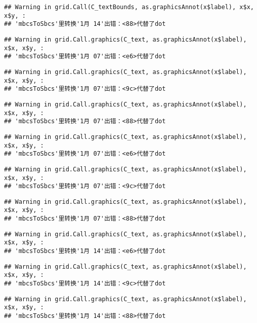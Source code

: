 \documentclass[
]{article}
\begin{document}
\begin{verbatim}
## Warning in grid.Call(C_textBounds, as.graphicsAnnot(x$label), x$x, x$y, :
## 'mbcsToSbcs'里转换'1月 14'出错：<88>代替了dot
\end{verbatim}

\begin{verbatim}
## Warning in grid.Call.graphics(C_text, as.graphicsAnnot(x$label), x$x, x$y, :
## 'mbcsToSbcs'里转换'1月 07'出错：<e6>代替了dot
\end{verbatim}

\begin{verbatim}
## Warning in grid.Call.graphics(C_text, as.graphicsAnnot(x$label), x$x, x$y, :
## 'mbcsToSbcs'里转换'1月 07'出错：<9c>代替了dot
\end{verbatim}

\begin{verbatim}
## Warning in grid.Call.graphics(C_text, as.graphicsAnnot(x$label), x$x, x$y, :
## 'mbcsToSbcs'里转换'1月 07'出错：<88>代替了dot
\end{verbatim}

\begin{verbatim}
## Warning in grid.Call.graphics(C_text, as.graphicsAnnot(x$label), x$x, x$y, :
## 'mbcsToSbcs'里转换'1月 07'出错：<e6>代替了dot
\end{verbatim}

\begin{verbatim}
## Warning in grid.Call.graphics(C_text, as.graphicsAnnot(x$label), x$x, x$y, :
## 'mbcsToSbcs'里转换'1月 07'出错：<9c>代替了dot
\end{verbatim}

\begin{verbatim}
## Warning in grid.Call.graphics(C_text, as.graphicsAnnot(x$label), x$x, x$y, :
## 'mbcsToSbcs'里转换'1月 07'出错：<88>代替了dot
\end{verbatim}

\begin{verbatim}
## Warning in grid.Call.graphics(C_text, as.graphicsAnnot(x$label), x$x, x$y, :
## 'mbcsToSbcs'里转换'1月 14'出错：<e6>代替了dot
\end{verbatim}

\begin{verbatim}
## Warning in grid.Call.graphics(C_text, as.graphicsAnnot(x$label), x$x, x$y, :
## 'mbcsToSbcs'里转换'1月 14'出错：<9c>代替了dot
\end{verbatim}

\begin{verbatim}
## Warning in grid.Call.graphics(C_text, as.graphicsAnnot(x$label), x$x, x$y, :
## 'mbcsToSbcs'里转换'1月 14'出错：<88>代替了dot
\end{verbatim}
\end{document}
